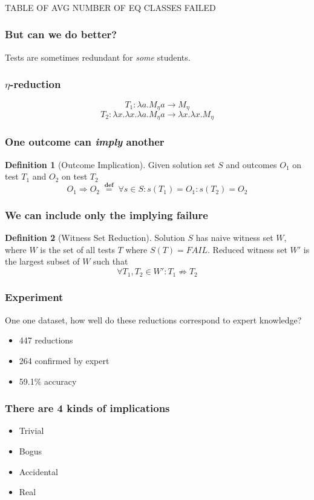 \documentclass[svgnames]{beamer}
\newcommand\fail{\mathit{FAIL}}
\newcommand\defined{\mathrel{\;\stackrel{\scriptscriptstyle\mathbf{def}}{=}\;}}
\theoremstyle{definition}
\newtheorem{defn}{Definition}
\begin{document}
\begin{frame}
\frametitle{}
TABLE OF AVG NUMBER OF EQ CLASSES FAILED
\end{frame}

\begin{frame}
\frametitle{But can we do better?}
Tests are sometimes redundant for \emph{some} students.
\end{frame}

\begin{frame}
\frametitle{$\eta$-reduction}
$$T_1 : \lambda a.M_\eta a \longrightarrow M_\eta$$
$$T_2 : \lambda x.\lambda x.\lambda a.M_\eta a \longrightarrow \lambda x.\lambda x.M_\eta$$
\end{frame}

\begin{frame}
\frametitle{One outcome can \emph{imply} another}
\begin{defn}[Outcome Implication]
Given solution set $S$ and outcomes $O_1$ on test $T_1$ and $O_2$ on test $T_2$
$$O_1 \Rightarrow O_2 \defined \forall s \in S : s(T_1) = O_1 : s(T_2) = O_2$$
\end{defn}
\end{frame}

\begin{frame}
\frametitle{We can include only the implying failure}
\begin{defn}[Witness Set Reduction]
Solution $S$ has naive witness set $W$, where $W$ is the set of all tests $T$ where $S(T) = \fail$.
Reduced witness set $W'$ is the largest subset of $W$ such that
$$\forall T_1, T_2 \in W' : T_1 \not\Rightarrow T_2$$
\end{defn}
\end{frame}

\begin{frame}
\frametitle{Experiment}
One one dataset, how well do these reductions correspond to expert knowledge?
\end{frame}

\begin{frame}
\begin{itemize}
\item 447 reductions
\item 264 confirmed by expert
\item 59.1\% accuracy
\end{itemize}
\end{frame}

\begin{frame}
\frametitle{There are 4 kinds of implications}
\begin{itemize}
\item Trivial
\item Bogus
\item Accidental
\item Real
\end{itemize}
\end{frame}
\end{document}
